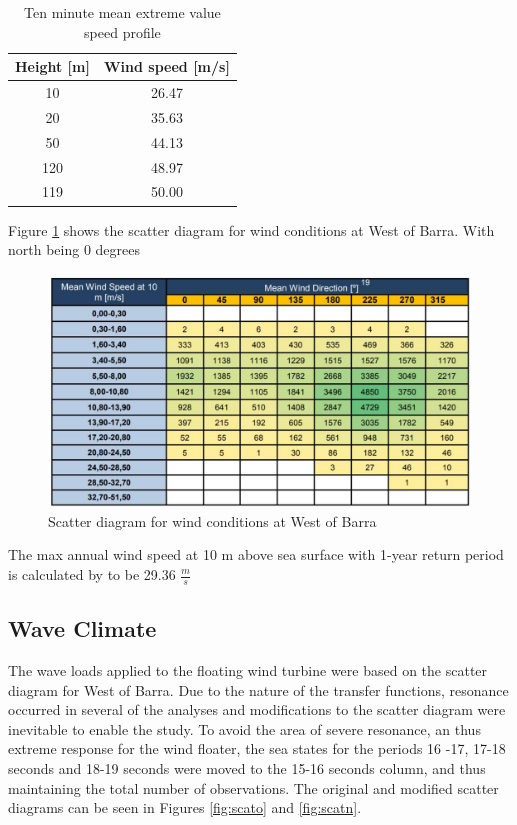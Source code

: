 \begin{table} [H]
\centering
\begin{tabular}{ |c|c|}
\hline
 Height [m]& Wind speed [m/s]\\
 \hline
 \hline
 10 & 26.47 \\

 20 & 35.63 \\
 
 50 & 44.13 \\
 
 120 & 48.97 \\

 119 & 50.00  \\
 \hline
\end{tabular}
\caption{Ten minute mean extreme value speed profile}
\label{table:windex}
\end{table}

\noindent Figure \ref{fig:scatterwind} shows the scatter diagram for wind conditions at West of Barra. With north being 0 degrees

\begin{figure}[H]
\centering
\includegraphics[scale=0.7]{figures/scatterwind}
\caption[$\; \:$Scatter diagram for wind conditions]{Scatter diagram for wind conditions at West of Barra \cite{Lifes50+D1.1} }
 \label{fig:scatterwind}
\end{figure}
 
 \noindent The max annual wind speed at 10 m above sea surface with 1-year return period is calculated by \cite{Lifes50+D1.1} to be  29.36 $\frac{m}{s}$



\subsection{Wave Climate}
The wave loads applied to the floating wind turbine were based on the scatter diagram for West of Barra. Due to the nature of the transfer functions,  resonance occurred in several of the analyses and modifications to the scatter diagram were inevitable to enable the study. To avoid the area of severe resonance, an thus extreme response for the wind floater, the sea states for the periods 16 -17, 17-18 seconds and 18-19 seconds were moved to the 15-16 seconds column, and thus maintaining the total number of observations. The original and modified scatter diagrams can be seen in Figures \ref{fig:scato} and \ref{fig:scatn}.

